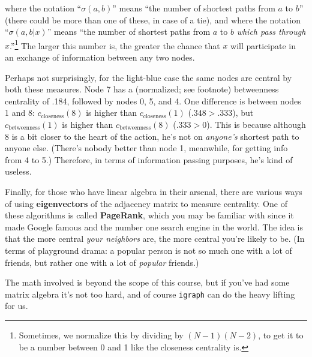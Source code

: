 \documentclass[12pt]{article}
\begin{document}
where the notation ``$\sigma(a,b)$'' means ``the number of shortest paths from
$a$ to $b$'' (there could be more than one of these, in case of a tie), and
where the notation ``$\sigma(a,b|x)$'' means ``the number of shortest paths
from $a$ to $b$ \textit{which pass through $x$}.''\footnote{Sometimes, we
normalize this by dividing by $(N-1)(N-2)$, to get it to be a number between 0
and 1 like the closeness centrality is.} The larger this number is, the
greater the chance that $x$ will participate in an exchange of information
between any two nodes.


Perhaps not surprisingly, for the light-blue case the same nodes are central
by both these measures. Node 7 has a (normalized; see footnote) betweenness
centrality of .184, followed by nodes 0, 5, and 4. One difference is between
nodes 1 and 8: $c_{\textrm{closeness}}(8)$ is higher than
$c_{\textrm{closeness}}(1)$ ($.348 > .333$), but $c_{\textrm{betweenness}}(1)$
is higher than $c_{\textrm{betweenness}}(8)$ ($.333 > 0$). This is because
although 8 is a bit closer to the heart of the action, he's not on
\textit{anyone's} shortest path to anyone else. (There's nobody better than
node 1, meanwhile, for getting info from 4 to 5.) Therefore, in terms of
information passing purposes, he's kind of useless.


\vspace{.2in}

Finally, for those who have linear algebra in their arsenal, there are various
ways of using \textbf{eigenvectors} of the adjacency matrix to measure
centrality. One of these algorithms is called \textbf{PageRank}, which you may
be familiar with since it made Google famous and the number one search engine
in the world. The idea is that the more central \textit{your neighbors} are,
the more central you're likely to be. (In terms of playground drama: a popular
person is not so much one with a lot of friends, but rather one with a lot of
\textit{popular} friends.)

The math involved is beyond the scope of this course, but if you've had some
matrix algebra it's not too hard, and of course \texttt{igraph} can do the
heavy lifting for us.
\end{document}
